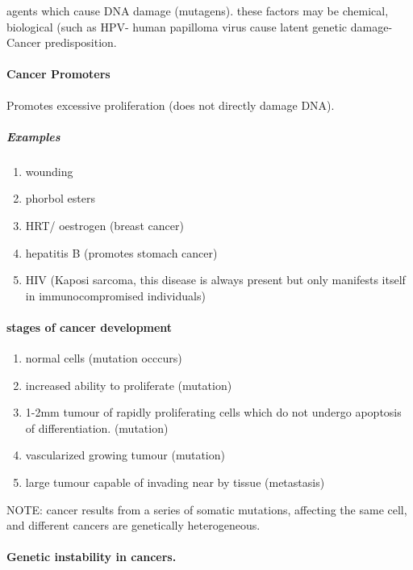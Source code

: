 \documentclass[]{article}
\providecommand{\tightlist}{%
  \setlength{\itemsep}{0pt}\setlength{\parskip}{0pt}}
\let\oldparagraph\paragraph
\renewcommand{\paragraph}[1]{\oldparagraph{#1}\mbox{}}
\let\oldsubparagraph\subparagraph
\renewcommand{\subparagraph}[1]{\oldsubparagraph{#1}\mbox{}}
\begin{document}
agents which cause DNA damage (mutagens). these factors may be chemical,
biological (such as HPV- human papilloma virus cause latent genetic
damage- Cancer predisposition.

\hypertarget{cancer-promoters}{%
\paragraph{Cancer Promoters}\label{cancer-promoters}}

Promotes excessive proliferation (does not directly damage DNA).

\hypertarget{examples}{%
\subparagraph{Examples}\label{examples}}

\begin{enumerate}
\def\labelenumi{\arabic{enumi}.}
\tightlist
\item
  wounding
\item
  phorbol esters
\item
  HRT/ oestrogen (breast cancer)
\item
  hepatitis B (promotes stomach cancer)
\item
  HIV (Kaposi sarcoma, this disease is always present but only manifests
  itself in immunocompromised individuals)
\end{enumerate}

\hypertarget{stages-of-cancer-development}{%
\paragraph{stages of cancer
development}\label{stages-of-cancer-development}}

\begin{enumerate}
\def\labelenumi{\arabic{enumi}.}
\tightlist
\item
  normal cells (mutation occcurs)
\item
  increased ability to proliferate (mutation)
\item
  1-2mm tumour of rapidly proliferating cells which do not undergo
  apoptosis of differentiation. (mutation)
\item
  vascularized growing tumour (mutation)
\item
  large tumour capable of invading near by tissue (metastasis)
\end{enumerate}

NOTE: cancer results from a series of somatic mutations, affecting the
same cell, and different cancers are genetically heterogeneous.

\hypertarget{genetic-instability-in-cancers.}{%
\paragraph{Genetic instability in
cancers.}\label{genetic-instability-in-cancers.}}
\end{document}
